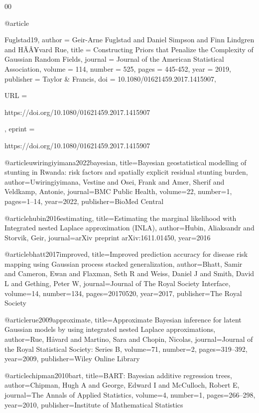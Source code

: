 \documentclass[preprint,12pt]{elsarticle}
\begin{document}
\begin{thebibliography}{00}
{@article{Fuglstad19,
author = {Geir-Arne Fuglstad and Daniel Simpson and Finn Lindgren and HÃÂ¥vard Rue},
title = {Constructing Priors that Penalize the Complexity of {G}aussian Random Fields},
journal = {Journal of the American Statistical Association},
volume = {114},
number = {525},
pages = {445-452},
year  = {2019},
publisher = {Taylor & Francis},
doi = {10.1080/01621459.2017.1415907},

URL = { 
        https://doi.org/10.1080/01621459.2017.1415907
    
},
eprint = { 
        https://doi.org/10.1080/01621459.2017.1415907
    
}

}

@article{uwiringiyimana2022bayesian,
  title={{Bayesian geostatistical modelling of stunting in Rwanda: risk factors and spatially explicit residual stunting burden}},
  author={Uwiringiyimana, Vestine and Osei, Frank and Amer, Sherif and Veldkamp, Antonie},
  journal={BMC Public Health},
  volume={22},
  number={1},
  pages={1--14},
  year={2022},
  publisher={BioMed Central}
}

@article{hubin2016estimating,
  title={{Estimating the marginal likelihood with Integrated nested Laplace approximation (INLA)}},
  author={Hubin, Aliaksandr and Storvik, Geir},
  journal={arXiv preprint arXiv:1611.01450},
  year={2016}
}

@article{bhatt2017improved,
  title={{Improved prediction accuracy for disease risk mapping using Gaussian process stacked generalization}},
  author={Bhatt, Samir and Cameron, Ewan and Flaxman, Seth R and Weiss, Daniel J and Smith, David L and Gething, Peter W},
  journal={Journal of The Royal Society Interface},
  volume={14},
  number={134},
  pages={20170520},
  year={2017},
  publisher={The Royal Society}
}



@article{rue2009approximate,
  title={{Approximate Bayesian inference for latent Gaussian models by using integrated nested Laplace approximations}},
  author={Rue, H{\aa}vard and Martino, Sara and Chopin, Nicolas},
  journal={Journal of the Royal Statistical Society: Series B},
  volume={71},
  number={2},
  pages={319--392},
  year={2009},
  publisher={Wiley Online Library}
}

@article{chipman2010bart,
  title={{BART: Bayesian additive regression trees}},
  author={Chipman, Hugh A and George, Edward I and McCulloch, Robert E},
  journal={The Annals of Applied Statistics},
  volume={4},
  number={1},
  pages={266--298},
  year={2010},
  publisher={Institute of Mathematical Statistics}
}

}
\end{thebibliography}
\end{document}
